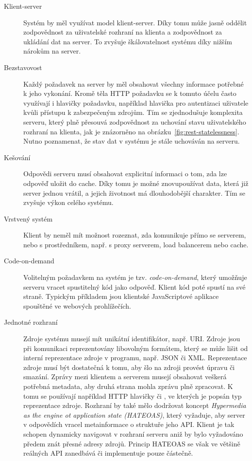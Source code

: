 \begin{description}
    \item [Klient-server] Systém by měl využívat model klient-server. Díky tomu může jasně oddělit
    zodpovědnost za uživatelské rozhraní na klienta a zodpovědnost za ukládání dat na server. To zvyšuje
    škálovatelnost systému díky nižším nárokům na server.
    \item [Bezstavovost] Každý požadavek na server by měl obsahovat všechny informace potřebné k jeho vykonání.
    Kromě těla \gls{HTTP} požadavku se k tomuto účelu často využívají i hlavičky požadavku,
    například hlavička  pro autentizaci uživatele kvůli přístupu k zabezpečeným zdrojům.
    Tím se zjednodušuje komplexita serveru, který plně přesouvá zodpovědnost za uchování stavu uživatelského rozhraní
    na klienta, jak je znázorněno na obrázku~\ref{fig:rest-statelessness}. Nutno poznamenat, že stav dat v systému
    je stále uchováván na serveru.
    \item [Kešování] Odpovědi serveru musí obsahovat explicitní informaci o tom, zda lze odpověď uložit do cache.
    Díky tomu je možné znovupoužívat data, která již server jednou vrátil, a jejich životnost má dlouhodobější charakter.
    Tím se zvyšuje výkon celého systému.
    \item [Vrstvený systém] Klient by neměl mít možnost rozeznat, zda komunikuje přímo se serverem, nebo s prostředníkem,
    např. s proxy serverem, load balancerem nebo cache.
    \item [Code-on-demand] Volitelným požadavkem na systém je tzv. \textit{code-on-demand}, který umožňuje serveru vracet
    spustitelný kód jako odpověď. Klient kód poté spustí na své straně. Typickým příkladem jsou klientské JavaScriptové aplikace spouštěné ve webových prohlížečích.
    \item [Jednotné rozhraní] Zdroje systému musejí mít unikátní identifikátor, např. \gls{URI}. Zdroje jsou při komunikaci reprezentovány libovolným formátem, který
    se může lišit od interní reprezentace zdroje v programu, např. \gls{JSON} či \gls{XML}. Reprezentace zdroje musí být
    dostatečná k tomu, aby šlo na zdroji provést úpravu či smazání. Zprávy mezi klientem a serverem musejí obsahovat veškerá potřebná metadata,
    aby druhá strana mohla zprávu plně zpracovat. K tomu se používají například \gls{HTTP} hlavičky 
    či , ve kterých je popsán typ reprezentace zdroje.
    Rozhraní by také mělo dodržovat koncept \textit{Hypermedia as the engine ot application state (\gls{HATEOAS})},
    který vyžaduje, aby server v odpovědích vracel metainformace o struktuře jeho \gls{API}.
    Klient je tak schopen dynamicky navigovat v rozhraní serveru aniž by bylo vyžadováno předem znát přesné adresy zdrojů.
    Princip \gls{HATEOAS} se však ve většině reálných \gls{API} zanedbává či implementuje pouze částečně.
\end{description}

